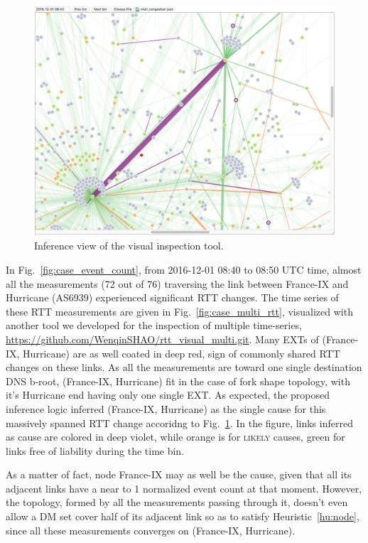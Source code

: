 \begin{figure}[!htb]
\centering
\includegraphics[width=1\textwidth]{gfx/chap5/case_infer_res.png}
\caption{Inference view of the visual inspection tool.}
\label{fig:case_infer_res}
\end{figure}

In Fig.~\ref{fig:case_event_count}, from 2016-12-01 08:40 to 08:50 UTC time, almost all the measurements (72 out of 76) traversing the link between France-IX and Hurricane (AS6939) experienced significant RTT changes.
The time series of these RTT measurements are given in Fig.~\ref{fig:case_multi_rtt}, visualized with another tool we developed for the inspection of multiple time-series, \url{https://github.com/WenqinSHAO/rtt_visual_multi.git}. Many \acp{EXT} of (France-IX, Hurricane) are as well coated in deep red, sign of commonly shared RTT changes on these links. As all the measurements are toward one single destination DNS b-root, 
(France-IX, Hurricane) fit in the case of fork shape topology, with it's Hurricane end having only one single \ac{EXT}. As expected, the proposed inference logic inferred (France-IX, Hurricane) as the single cause for this massively spanned RTT change accoridng to Fig.~\ref{fig:case_infer_res}. In the figure, links inferred as cause are colored in deep violet, while orange is for \textsc{likely} causes, green for links free of liability during the time bin.

As a matter of fact, node France-IX may as well be the cause, given that all its adjacent links have a near to 1 normalized event count at that moment. However, the topology, formed by all the measurements passing through it, doesn't even allow a \ac{DM} set cover half of its adjacent link so as to satisfy Heuristic~\ref{hu:node}, since all these measurements converges on (France-IX, Hurricane).

